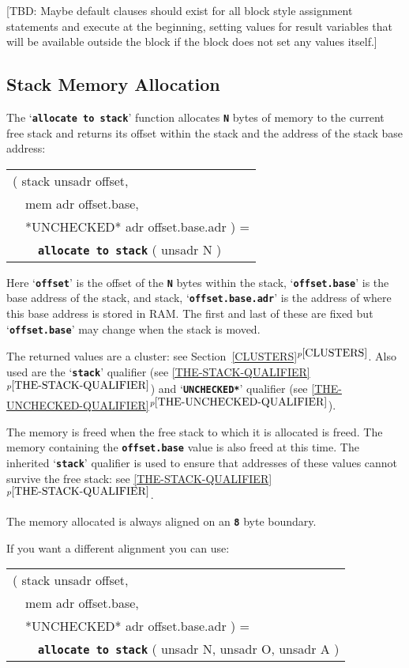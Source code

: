 \documentclass[12pt]{article}
\makeatletter
\newcommand{\TT}[1]{{\tt \bfseries #1}}
\newcommand{\ttkey}[1]{\TT{#1}\index{#1@{\tt #1}}}
\newcommand{\itemref}[1]{\ref{#1}$^{p\pageref{#1}}$}
\newenvironment{indpar}[1][0.3in]%
	{\begin{list}{}%
		     {\setlength{\itemsep}{0in}%
		      \setlength{\topsep}{0in}%
		      \setlength{\parsep}{1ex}%
		      \setlength{\labelwidth}{#1}%
		      \setlength{\leftmargin}{#1}%
		      \addtolength{\leftmargin}{\labelsep}}%
	 \item}%
	{\end{list}}
\makeatother
\begin{document}
[TBD: Maybe default clauses should exist for all block style
assignment statements and execute at the beginning, setting
values for result variables that will be available outside
the block if the block does not set any values itself.]

\subsection{Stack Memory Allocation}
\label{STACK-MEMORY-ALLOCATION}

The `\ttkey{allocate to stack}' function allocates \TT{N} bytes of
memory to the current free stack and returns its offset within
the stack and the address of the stack base address:

\begin{indpar}\tt\begin{tabular}{l}
( stack unsadr offset, \\
~~mem adr offset.base, \\
~~*UNCHECKED* adr offset.base.adr  ) = \\
~~~~\ttkey{allocate to stack} ( unsadr N ) \\
\end{tabular}\end{indpar}\label{ALLOCATE-TO-STACK}

Here `\TT{offset}' is the offset of the \TT{N} bytes within the
stack, `\TT{offset.base}' is the base address of the stack, and
stack, `\TT{offset.base.adr}' is the address of where this
base address is stored in RAM.  The first and last of these
are fixed but `\TT{offset.base}' may change when the stack is
moved.

The returned values are a cluster: see Section~\itemref{CLUSTERS}.
Also used are the `\TT{stack}' qualifier (see \itemref{THE-STACK-QUALIFIER})
and `\TT{*UNCHECKED*}' qualifier (see \itemref{THE-UNCHECKED-QUALIFIER}).

The memory is freed when the free stack to which it is allocated
is freed.  The memory containing the \TT{offset.base} value is
also freed at this time.  The inherited `\TT{stack}' qualifier is used to
ensure that addresses of these values cannot survive the free stack:
see \itemref{THE-STACK-QUALIFIER}.

The memory allocated is always aligned on an \TT{8} byte boundary.

If you want a different alignment you can use:

\begin{indpar}\tt\begin{tabular}{l}
( stack unsadr offset, \\
~~mem adr offset.base, \\
~~*UNCHECKED* adr offset.base.adr  ) = \\
~~~~\ttkey{allocate to stack} ( unsadr N, unsadr O, unsadr A ) \\
\end{tabular}\end{indpar}
\end{document}
